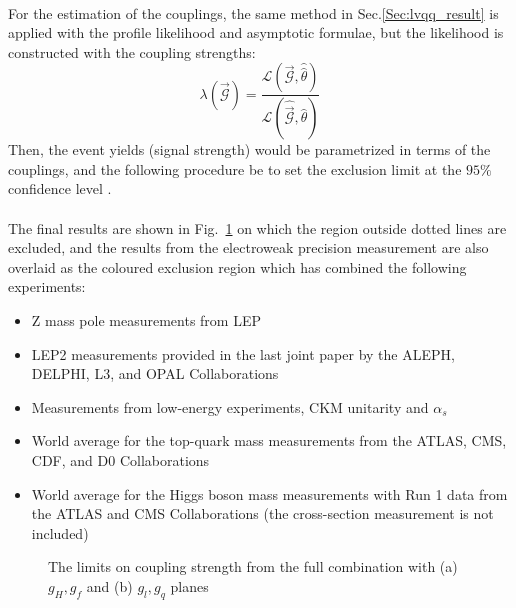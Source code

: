 \noindent
\\For the estimation of the couplings, the same method in Sec.\ref{Sec:lvqq_result} is applied with the profile likelihood and asymptotic formulae, but the likelihood is constructed with the coupling strengths:
\begin{equation}
\lambda(\vec{\mathcal{G}}) = \frac{\mathcal{L}(\vec{\mathcal{G}},\hat{\hat{\theta}})}{\mathcal{L}(\hat{\vec{\mathcal{G}}},\hat{\theta})}
\end{equation}
Then, the event yields (signal strength) would be parametrized in terms of the couplings, and the following procedure be to set the exclusion limit at the $95\%$ confidence level .
\\
\\The final results are shown in Fig.~\ref{Fig:limit_coupling} on which the region outside dotted lines are excluded, and the results from the electroweak precision measurement \cite{delAguila:2010mx} are also overlaid as the coloured exclusion region which has combined the following experiments:
\begin{itemize}
	\item Z mass pole measurements from LEP\cite{delAguila:2010mx}
	\item LEP2 measurements provided in the last joint paper by the ALEPH, DELPHI, L3, and OPAL Collaborations\cite{Schael:2013ita}
	\item Measurements from low-energy experiments, CKM unitarity and $\alpha_{s}$\cite{Olive_2016}
	\item World average for the top-quark mass measurements from the ATLAS, CMS, CDF, and D0 Collaborations\cite{ATLAS:2014wva}
	\item World average for the Higgs boson mass measurements with Run 1 data from the ATLAS and CMS Collaborations (the cross-section measurement is not included)\cite{Aad:2015zhl}
\end{itemize}   
\begin{figure}[ht]
	\centering
	\caption{The limits on coupling strength from the full combination with (a) {$g_H, g_f$} and (b) {$g_l, g_q$} planes }
	\label{Fig:limit_coupling}
\end{figure}
